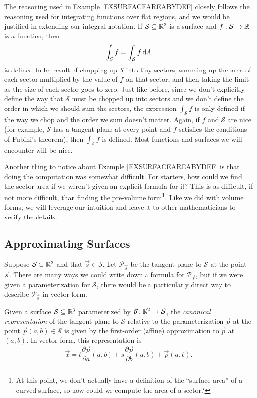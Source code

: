 The reasoning used in Example \ref{EXSURFACEAREABYDEF} closely follows the reasoning
used for integrating functions over flat regions, and we would be justified in extending our integral
notation.  If $\mathcal S\subseteq\mathbb{R}^3$ is a surface and $f:\mathcal S\to\mathbb{R}$ is a function,
then
\[
	\int_{\mathcal S} f  = \int_{\mathcal S} f\,\mathrm{d} A
\]
is defined to be result of chopping up $\mathcal S$ into tiny sectors, summing up the
area of each sector multiplied by the value of $f$ on that sector, and then taking the limit as
the size of each sector goes to zero.  Just like before, since we don't explicitly define the way
that $\mathcal S$ must be chopped up into sectors and we don't define the order in which we
should sum the sectors, the expression $\int_{\mathcal S}f$ is only defined if the way we chop
and the order we sum doesn't matter.  Again, if $f$ and $\mathcal S$ are nice (for example, $\mathcal S$
has a tangent plane at every point and $f$ satisfies the conditions of Fubini's theorem), then
$\int_{\mathcal S} f$ is defined.  Most functions and surfaces we will encounter will be nice.

Another thing to notice about Example \ref{EXSURFACEAREABYDEF} is that doing the
computation was somewhat difficult.
For starters, how could we find the sector area if we weren't given an explicit formula for it?
This is as difficult, if not more difficult, than finding the pre-volume form\footnote{
At this point, we don't actually have a definition of the ``surface area'' of a curved surface, 
so how could we compute the area of a sector?}.  Like we did with volume forms, we will leverage
our intuition and leave it to other mathematicians to verify the details.

\subsection{Approximating Surfaces}

Suppose $\mathcal S\subset \mathbb{R}^3$ and that $\vec s\in\mathcal S$.  Let $\mathcal P_{\vec s}$ be the
tangent plane to $\mathcal S$ at the point $\vec s$.  There are many ways we could write down
a formula for $\mathcal P_{\vec s}$, but if we were given a parameterization for $\mathcal S$,
there would be a particularly direct way to describe $\mathcal P_{\vec s}$ in vector form.

\begin{definition}
	Given a surface $\mathcal S\subseteq\mathbb{R}^3$ parameterized by $\vec p:\mathbb{R}^2\to\mathcal S$,
	the \emph{canonical representation} of the tangent plane to $\mathcal S$
	relative to the parameterization $\vec p$
	at the point $\vec p(a,b)\in\mathcal S$ is given by the first-order
	(affine) approximation to $\vec p$ at $(a,b)$.  In vector form, this representation
	is
	\[
		\vec x = t \frac{\partial \vec p}{\partial a}(a,b) + s\frac{\partial \vec p}{\partial b}(a,b)
		+\vec p(a,b).
	\]
\end{definition}

